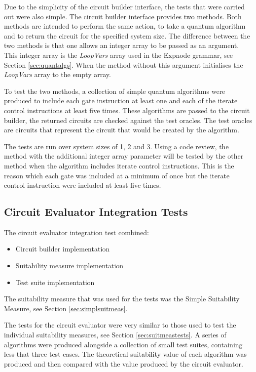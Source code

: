 Due to the simplicity of the circuit builder interface, the tests that were carried out were also simple.
The circuit builder interface provides two methods.
Both methods are intended to perform the same action, to take a quantum algorithm and to return the circuit for the specified system size.
The difference between the two methods is that one allows an integer array to be passed as an argument.
This integer array is the \emph{LoopVars} array used in the Expnode grammar, see Section \ref{sec:quantalgs}.
When the method without this argument initialises the \emph{LoopVars} array to the empty array.

To test the two methods, a collection of simple quantum algorithms were produced to include each gate instruction at least one and each of the iterate control instructions at least five times.
These algorithms are passed to the circuit builder, the returned circuits are checked against the test oracles.
The test oracles are circuits that represent the circuit that would be created by the algorithm.

The tests are run over system sizes of 1, 2 and 3.
Using a code review, the method with the additional integer array parameter will be tested by the other method when the algorithm includes iterate control instructions.
This is the reason which each gate was included at a minimum of once but the iterate control instruction were included at least five times.

\subsection{Circuit Evaluator Integration Tests}
\label{sec:cirevaltests}
The circuit evaluator integration test combined:
\begin{itemize}
 \item Circuit builder implementation
 \item Suitability measure implementation
 \item Test suite implementation
\end{itemize}

The suitability measure that was used for the tests was the Simple Suitability Measure, see Section \ref{sec:simplsuitmeas}.

The tests for the circuit evaluator were very similar to those used to test the individual suitability measures, see Section \ref{sec:suitmeastests}.
A series of algorithms were produced alongside a collection of small test suites, containing less that three test cases.
The theoretical suitability value of each algorithm was produced and then compared with the value produced by the circuit evaluator.

